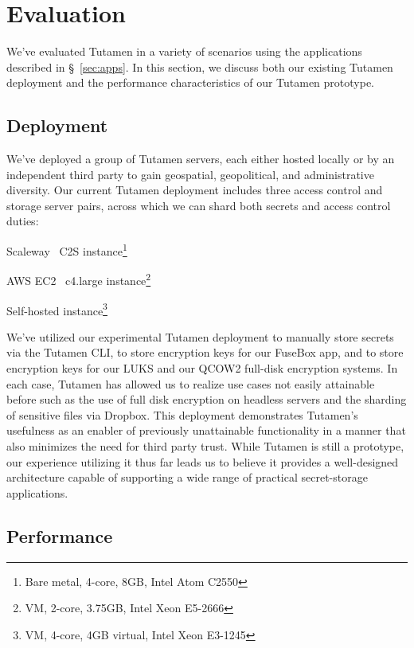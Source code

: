 \section{Evaluation}
\label{sec:eval}

We've evaluated Tutamen in a variety of scenarios using the
applications described in \S~\ref{sec:apps}. In this section, we
discuss both our existing Tutamen deployment and the performance
characteristics of our Tutamen prototype.

\subsection{Deployment}
\label{sec:eval:deployment}

We've deployed a group of Tutamen servers, each either hosted locally
or by an independent third party to gain geospatial, geopolitical, and
administrative diversity. Our current Tutamen deployment includes
three access control and storage server pairs, across which we can
shard both secrets and access control duties:

\begin{packed_desc}
\item[France:] Scaleway~\cite{scaleway} C2S instance\footnote{Bare
  metal, 4-core, 8GB, Intel Atom C2550}
\item[North Virginia:] AWS EC2~\cite{amazon-ec2} c4.large
  instance\footnote{VM, 2-core, 3.75GB, Intel Xeon E5-2666}
\item[Colorado:] Self-hosted instance\footnote{VM, 4-core, 4GB virtual,
  Intel Xeon E3-1245}
\end{packed_desc}

We've utilized our experimental Tutamen deployment to manually store
secrets via the Tutamen CLI, to store encryption keys for our FuseBox
app, and to store encryption keys for our LUKS and our QCOW2 full-disk
encryption systems. In each case, Tutamen has allowed us to realize
use cases not easily attainable before such as the use of full disk
encryption on headless servers and the sharding of sensitive files via
Dropbox. This deployment demonstrates Tutamen's usefulness as an
enabler of previously unattainable functionality in a manner that also
minimizes the need for third party trust. While Tutamen is still a
prototype, our experience utilizing it thus far leads us to believe it
provides a well-designed architecture capable of supporting a wide
range of practical secret-storage applications.

\subsection{Performance}
\label{sec:eval:perf}

